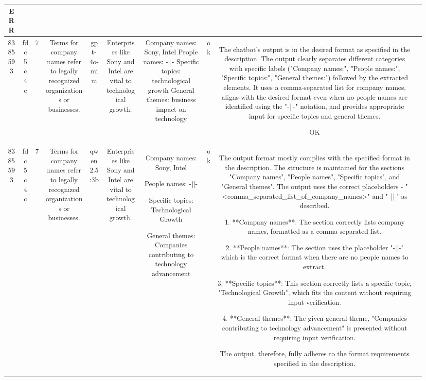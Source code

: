 \begin{table}[h!]
\begin{tabular}{|c|c|c|c|c|c|c|c|c|c|}
ERR & \\
\hline
8385593 & fdc5c4c & 7 & Terms for company names refer to legally recognized organizations or businesses. & gpt-4o-mini & Enterprises like Sony and Intel are vital to technological growth. & Company names: Sony, Intel  
People names: -||-  
Specific topics: technological growth  
General themes: business impact on technology & ok & The chatbot's output is in the desired format as specified in the description. The output clearly separates different categories with specific labels ("Company names:", "People names:", "Specific topics:", "General themes:") followed by the extracted elements. It uses a comma-separated list for company names, aligns with the desired format even when no people names are identified using the "-||-" notation, and provides appropriate input for specific topics and general themes. 

OK & \\
\hline
8385593 & fdc5c4c & 7 & Terms for company names refer to legally recognized organizations or businesses. & qwen2.5:3b & Enterprises like Sony and Intel are vital to technological growth. & Company names: Sony, Intel

People names: -||-

Specific topics: Technological Growth

General themes: Companies contributing to technology advancement & ok & The output format mostly complies with the specified format in the description. The structure is maintained for the sections "Company names", "People names", "Specific topics", and "General themes". The output uses the correct placeholders - "<comma_separated_list_of_company_names>" and "-||-" as described.

1. **Company names**: The section correctly lists company names, formatted as a comma-separated list.

2. **People names**: The section uses the placeholder "-||-" which is the correct format when there are no people names to extract.

3. **Specific topics**: This section correctly lists a specific topic, "Technological Growth", which fits the content without requiring input verification.

4. **General themes**: The given general theme, "Companies contributing to technology advancement" is presented without requiring input verification.

The output, therefore, fully adheres to the format requirements specified in the description.


\end{tabular}
\end{table}
